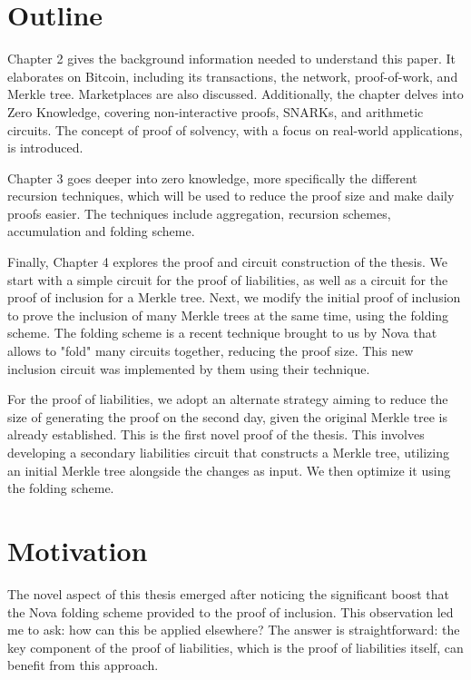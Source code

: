 \section{Outline}

Chapter 2 gives the background information needed to understand this paper.
It elaborates on Bitcoin, including its transactions, the network, proof-of-work, and Merkle tree. Marketplaces are also discussed. 
Additionally, the chapter delves into Zero Knowledge, covering non-interactive proofs, SNARKs, and arithmetic circuits.
The concept of proof of solvency, with a focus on real-world applications, is introduced. 

Chapter 3 goes deeper into zero knowledge, more specifically the different recursion techniques, which will be used to reduce the proof size and make 
daily proofs easier.
The techniques include aggregation, recursion schemes, accumulation and folding scheme.

Finally, Chapter 4 explores the proof and circuit construction of the thesis.
We start with a simple circuit for the proof of liabilities, as well as a circuit for the proof of inclusion for a Merkle tree.
Next, we modify the initial proof of inclusion to prove the inclusion of many Merkle trees at the same time, using the folding scheme.
The folding scheme is a recent technique brought to us by Nova that allows to "fold" many circuits together, reducing the proof size. 
This new inclusion circuit was implemented by them using their technique.

For the proof of liabilities, we adopt an alternate strategy aiming to reduce the size of generating the proof on the second day, 
given the original Merkle tree is already established. This is the first novel proof of the thesis.
This involves developing a secondary liabilities circuit that constructs a Merkle tree, utilizing an initial Merkle tree alongside the changes as input.
We then optimize it using the folding scheme.


\section{Motivation}
The novel aspect of this thesis emerged after noticing the significant boost that the Nova folding scheme provided
to the proof of inclusion. This observation led me to ask: how can this be applied elsewhere? The answer is straightforward: the key component of the proof of liabilities, 
which is the proof of liabilities itself, can benefit from this approach.

